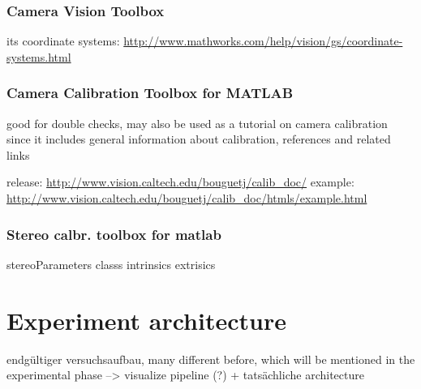 \subsubsection{Camera Vision Toolbox}
its coordinate systems: \url{http://www.mathworks.com/help/vision/gs/coordinate-systems.html}
\subsubsection{Camera Calibration Toolbox for MATLAB}
good for double checks, may also be used as a tutorial on camera calibration since it includes general information about calibration, references and related links

release: \url{http://www.vision.caltech.edu/bouguetj/calib_doc/}
example: \url{http://www.vision.caltech.edu/bouguetj/calib_doc/htmls/example.html}

\subsubsection{Stereo calbr. toolbox for matlab}
stereoParameters classs
intrinsics
extrisics


\section{Experiment architecture} \label{sec:architecture}
endgültiger versuchsaufbau, many different before, which will be mentioned in the experimental phase --> visualize pipeline (?) + tatsächliche architecture

